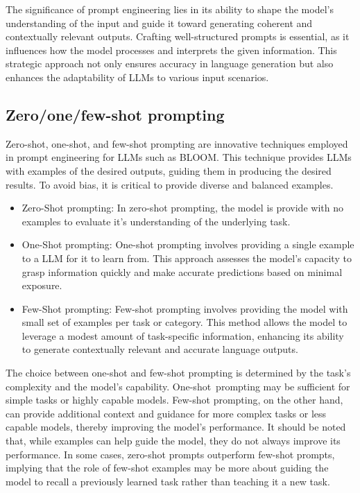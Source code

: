 The significance of prompt engineering lies in its ability to shape the model's understanding of the input and guide it toward generating coherent and contextually relevant outputs. Crafting well-structured prompts is essential, as it influences how the model processes and interprets the given information. This strategic approach not only ensures accuracy in language generation but also enhances the adaptability of LLMs to various input scenarios.




\subsection{Zero/one/few-shot prompting}

Zero-shot, one-shot, and few-shot prompting are innovative techniques employed in prompt engineering for LLMs such as BLOOM. This technique provides LLMs with examples of the desired outputs, guiding them in producing the desired results. To avoid bias, it is critical to provide diverse and balanced examples. \cite{chen2023unleashing}

\begin{itemize}
    \item Zero-Shot prompting: In zero-shot prompting, the model is provide with no examples to evaluate it's understanding of the underlying task. 
    \item One-Shot prompting: One-shot prompting involves providing a single example to a LLM for it to learn from. This approach assesses the model's capacity to grasp information quickly and make accurate predictions based on minimal exposure.
    \item Few-Shot prompting: Few-shot prompting involves providing the model with small set of examples per task or category. This method allows the model to leverage a modest amount of task-specific information, enhancing its ability to generate contextually relevant and accurate language outputs.
\end{itemize}

The choice between one-shot and few-shot prompting is determined by the task's complexity and the model's capability. One-shot prompting may be sufficient for simple tasks or highly capable models. Few-shot prompting, on the other hand, can provide additional context and guidance for more complex tasks or less capable models, thereby improving the model's performance. It should be noted that, while examples can help guide the model, they do not always improve its performance. In some cases, zero-shot prompts outperform few-shot prompts, implying that the role of few-shot examples may be more about guiding the model to recall a previously learned task rather than teaching it a new task.


